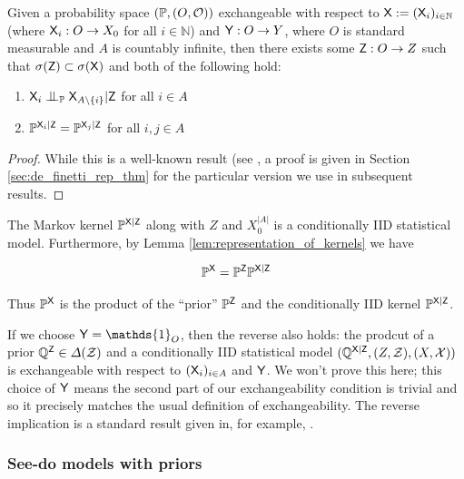 \begin{theorem}[Representation]\label{th:de_finetti_rep_thm}
Given a probability space $(\mathbb{P},(O,\mathcal{O}))$ exchangeable with respect to $\mathsf{X}:=(\mathsf{X}_i)_{i\in \mathbb{N}}$ (where $\mathsf{X}_i:O\to X_0$ for all $i\in \mathbb{N}$) and $\mathsf{Y}:O\to Y$, where $O$ is standard measurable and $A$ is countably infinite, then there exists some $\mathsf{Z}:O\to Z$ such that $\sigma(\mathsf{Z})\subset \sigma(\mathsf{X})$ and both of the following hold:
\begin{enumerate}
    \item $\RV{X}_i\CI_{\kernel{P}}\RV{X}_{A\setminus\{i\}}|\RV{Z}$ for all $i\in A$
    \item $\mathbb{P}^{\mathsf{X}_i|\mathsf{Z}}=\mathbb{P}^{\mathsf{X}_j|\mathsf{Z}}$ for all $i,j\in A$
\end{enumerate}
\end{theorem}

\begin{proof}
While this is a well-known result (see \citet{de_finetti_foresight_1992,hewitt_symmetric_1955}, a proof is given in Section \ref{sec:de_finetti_rep_thm} for the particular version we use in subsequent results.
\end{proof}

The Markov kernel $\mathbb{P}^{\mathsf{X}|\mathsf{Z}}$ along with $Z$ and $X_0^{|A|}$ is a conditionally IID statistical model. Furthermore, by Lemma \ref{lem:representation_of_kernels} we have

\begin{align}
    \mathbb{P}^{\mathsf{X}}=\mathbb{P}^{\mathsf{Z}}\mathbb{P}^{\mathsf{X}|\mathsf{Z}}
\end{align}

Thus $\mathbb{P}^{\mathsf{X}}$ is the product of the ``prior'' $\mathbb{P}^{\mathsf{Z}}$ and the conditionally IID kernel $\mathbb{P}^{\mathsf{X}|\mathsf{Z}}$.

If we choose $\RV{Y}=\mathds{1}_{O}$, then the reverse also holds: the prodcut of a prior $\mathbb{Q}^{\mathsf{Z}}\in \Delta(\mathcal{Z})$ and a conditionally IID statistical model $(\mathbb{Q}^{\mathsf{X}|\mathsf{Z}},(Z,\mathcal{Z}),(X,\mathcal{X}))$ is exchangeable with respect to $(\mathsf{X}_i)_{i\in A}$ and $\mathsf{Y}$. We won't prove this here; this choice of $\mathsf{Y}$ means the second part of our exchangeability condition is trivial and so it precisely matches the usual definition of exchangeability. The reverse implication is a standard result given in, for example, \citet{de_finetti_foresight_1992}.


\subsubsection{See-do models with priors}

